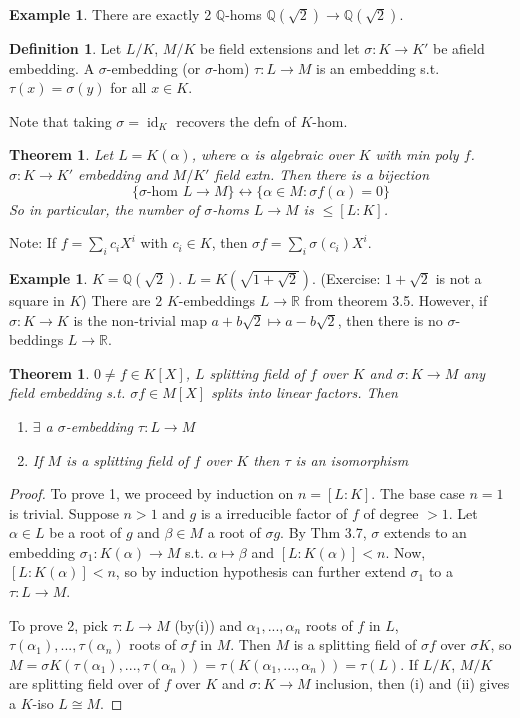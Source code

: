 \documentclass{article}
\theoremstyle{definition}
\newtheorem*{defn*}{Definition}
\newtheorem{example}[defn]{Example}
\theoremstyle{remark}
\theoremstyle{plain}
\newtheorem{thm}[defn]{Theorem}
\newcommand{\QQ}{\mathbb{Q}}
\newcommand{\RR}{\mathbb{R}}
\begin{document}
\begin{example}
    There are exactly 2 $\QQ$-homs $\QQ(\sqrt 2)\to\QQ(\sqrt 2)$.
\end{example}
\begin{defn*}
    Let $L/K$, $M/K$ be field extensions and let $\sigma:K\to K'$ be  afield embedding. A $\sigma$-embedding (or $\sigma$-hom) $\tau:L\to M$ is an embedding s.t. $\tau(x)=\sigma(y)$ for all $x\in K$.
\end{defn*}
Note that taking $\sigma=\operatorname{id}_K$ recovers the defn of $K$-hom.
\begin{thm}
     Let $L=K(\alpha)$, where $\alpha$ is algebraic over $K$ with min poly $f$. $\sigma:K\to K'$ embedding and $M/K'$ field extn. Then there is a bijection
     \[\{\sigma\text{-hom }L\to M\}\leftrightarrow\{\alpha\in M:\sigma f(\alpha)=0\}\]
     So in particular, the number of $\sigma$-homs $L\to M$ is $\le [L:K]$.
\end{thm}
Note: If $f=\sum_ic_iX^i$ with $c_i\in K$, then $\sigma f=\sum_i\sigma(c_i)X^i$.
\begin{example}
    $K=\QQ(\sqrt 2)$. $L=K(\sqrt{1+\sqrt{2}})$. (Exercise: $1+\sqrt{2}$ is not a square in $K$) There are $2$ $K$-embeddings $L\to\RR$ from theorem 3.5. However, if $\sigma:K\to K$ is the non-trivial map $a+b\sqrt{2}\mapsto a-b\sqrt{2}$, then there is no $\sigma$-beddings $L\to\RR$.
\end{example}
\begin{thm}
    $0\neq f\in K[X]$, $L$ splitting field of $f$ over $K$ and $\sigma:K\to M$ any field embedding s.t. $\sigma f\in M[X]$ splits into linear factors. Then
    \begin{enumerate}
        \item $\exists$ a $\sigma$-embedding $\tau:L\to M$
        \item If $M$ is a splitting field of $f$ over $K$ then $\tau$ is an isomorphism
    \end{enumerate}
\end{thm}
\begin{proof}
    To prove 1, we proceed by induction on $n=[L:K]$. The base case $n=1$ is trivial. Suppose $n>1$ and $g$ is a irreducible factor of $f$ of degree $>1$. Let $\alpha\in L$ be a root of $g$ and $\beta\in M$ a root of $\sigma g$. By Thm 3.7, $\sigma$ extends to an embedding $\sigma_1:K(\alpha)\to M$ s.t. $\alpha\mapsto\beta$ and $[L:K(\alpha)]< n$.
    Now, $[L:K(\alpha)]<n$, so by induction hypothesis can further extend $\sigma_1$ to a $\tau:L\to M$.

    To prove 2, pick $\tau:L\to M$ (by(i)) and $\alpha_1,...,\alpha_n$ roots of $f$ in $L$, $\tau(\alpha_1),...,\tau(\alpha_n)$ roots of $\sigma f$ in $M$. Then $M$ is a splitting field of $\sigma f$ over $\sigma K$, so $M=\sigma K(\tau(\alpha_1),...,\tau(\alpha_n))=\tau(K(\alpha_1,...,\alpha_n))=\tau(L)$. If $L/K$, $M/K$ are splitting field over of $f$ over $K$ and $\sigma:K\to M$ inclusion, then (i) and (ii) gives a $K$-iso $L\cong M$.
\end{proof}
\end{document}
